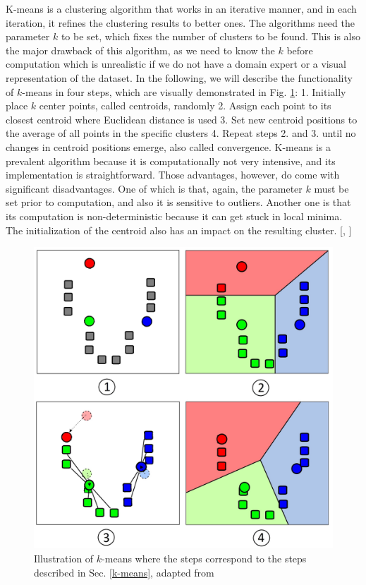 K-means is a clustering algorithm that works in an iterative manner, and in each iteration, it refines the clustering results to better ones. The algorithms need the parameter $k$ to be set, which fixes the number of clusters to be found. This is also the major drawback of this algorithm, as we need to know the $k$ before computation which is unrealistic if we do not have a domain expert or a visual representation of the dataset. In the following, we will describe the functionality of $k$-means in four steps, which are visually demonstrated in Fig. \ref{fig:k-means}: 1. Initially place $k$ center points, called centroids, randomly 2. Assign each point to its closest centroid where Euclidean distance is used 3. Set new centroid positions to the average of all points in the specific clusters 4. Repeat steps 2. and 3. until no changes in centroid positions emerge, also called convergence. K-means is a prevalent algorithm because it is computationally not very intensive, and its implementation is straightforward. Those advantages, however, do come with significant disadvantages. One of which is that, again, the parameter $k$ must be set prior to computation, and also it is sensitive to outliers. Another one is that its computation is non-deterministic because it can get stuck in local minima. The initialization of the centroid also has an impact on the resulting cluster. [\cite{clustering(1)}, \cite{wiki_k-means}]
\begin{figure}[!]
	\centering
	\includegraphics[width=0.75\columnwidth]{images/k-means.jpg}
	\caption[Illustration of $k$-Means]{Illustration of $k$-means where the steps correspond to the steps described in Sec. \ref{k-means}, adapted from \cite{wiki_k-means}}
    \label{fig:k-means}
\end{figure}

